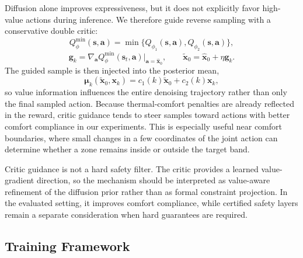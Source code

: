 \documentclass[conference]{IEEEtran}
\theoremstyle{nonumberplain}
\theoremstyle{plain}
\begin{document}
Diffusion alone improves expressiveness, but it does not explicitly favor high-value actions during inference. We therefore guide reverse sampling with a conservative double critic:
\begin{equation}
    Q_{\phi}^{\min}(\mathbf{s},\mathbf{a})=
    \min\{Q_{\phi_1}(\mathbf{s},\mathbf{a}),Q_{\phi_2}(\mathbf{s},\mathbf{a})\},
    \label{eq:qmin}
\end{equation}
\begin{equation}
    \mathbf{g}_k=
    \nabla_{\mathbf{a}}Q_{\phi}^{\min}(\mathbf{s}_t,\mathbf{a})
    \big|_{\mathbf{a}=\hat{\mathbf{x}}_0},
    \qquad
    \tilde{\mathbf{x}}_0=\hat{\mathbf{x}}_0+\eta \mathbf{g}_k.
    \label{eq:guided_x0}
\end{equation}
The guided sample is then injected into the posterior mean,
\begin{equation}
    \boldsymbol{\mu}_k(\tilde{\mathbf{x}}_0,\mathbf{x}_k)=
    c_1(k)\tilde{\mathbf{x}}_0 + c_2(k)\mathbf{x}_k,
    \label{eq:guided_mean}
\end{equation}
so value information influences the entire denoising trajectory rather than only the final sampled action. Because thermal-comfort penalties are already reflected in the reward, critic guidance tends to steer samples toward actions with better comfort compliance in our experiments. This is especially useful near comfort boundaries, where small changes in a few coordinates of the joint action can determine whether a zone remains inside or outside the target band.

Critic guidance is not a hard safety filter. The critic provides a learned value-gradient direction, so the mechanism should be interpreted as value-aware refinement of the diffusion prior rather than as formal constraint projection. In the evaluated setting, it improves comfort compliance, while certified safety layers remain a separate consideration when hard guarantees are required.

\subsection{Training Framework}
\end{document}
